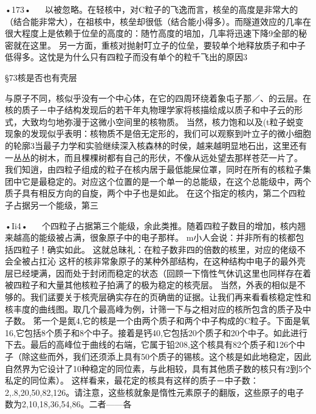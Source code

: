 •173•
  
以被忽略。在轻核中，对C粒子的飞逸而言，核垒的高度是非常大的（结合能非常大），在祖核中，核垒却很低（结合能小得多）。而隧道效应的几率在很大程度上是依赖于位垒的高度的：随竹高度的培加，几率将迅速下降9全部的秘密就在这里。
另一方面，重核对抛射叮立子的位垒，要较单个地释放质子和中子低得多。这忱是为什么只有四粒子而没有单个的粒千飞出的原因3

§73核是否也有壳层

与原子不同，核似乎没有一个中心体，在它的四周环绕着象屯子那／、的云层。在核的质子－中子结构发现后的若干年丸物理学家将核描绘成以质子和中子云的形式，大致均匀地弥漫于这微小空间里的核物质。
当然，核力饱和以及(t粒子蜕变现象的发现似乎表明：核物质不是倍无定形的，我们可以观察到叶立子的微小细胞的轮廓3当最子力学和实验继续深入核森林的时侯，越来越明显地石出，这里还有一丛丛的树木，而且棵棵树都有自己的形伏，不像从远处望去那样苍茫一片了。
我们知逍，由四粒子组成的粒子在核内居于最低能屎位罩，同时在所有的核粒子集团中它是最稳定的。对应这个位置的是一个单一的总能级，在这个总能级中，两个质子具有相反方向的自旋，两个中子也是如此。
在这个指定的核内，第二个四粒子占据另一个能级，第三

•Ii4•
  
个四粒子占据第三个能级，余此类推。随着四粒子数目的增加，核内翘来越高的能级被占满，很象原子中的电子那样。
m小人会说：并非所有的核都包括四粒子！确实如此。
这就总昧礼：在粒子数非四的倍数的核里，对应的佬级不会全被占扛沁
这杆的核非常象原子的某种外部结构，在这种结构中电子的最外壳层已经埂满，因而处于封闭而稳定的状态（回顾一下惰性气休讥这里也同样存在着被四粒子和大量其他核粒子拍满了的极为稳定的核壳层。
当然，外表的相似是不够的。我们盓要关于核壳层确实存在的页确凿的证据。让我们再来看看核稳定性和核丰度的曲线图。取几个最高峰为例，计筛一下与之相对应的核所包含的质子及中子数。
笫一个是氮4,它的核是一个由两个质子和两个中子构成的C粒子。下面是氧16,它包括8个质子和8个中子。接着是钙40,它包括20个质子和20个中子。如此进行下去。最后的高峰位于曲线的右端，它属于铅208,这个核具有82个质子和126个中子（除这些而外，我们还须添上具有50个质子的锡核。这个核是如此地稳定，因此自然界为它设计了10种稳定的同位素，与此相较，具有其他质子数的核只有2到5个私定的同位素）。
这样看来，最花定的核具有这样的质子－中子数：2,.8,20,50,82,126。请注意，这些核就象是惰性元素原子的翻版，这些原子的电子数为2,10,18,36,54,86。二者——各

